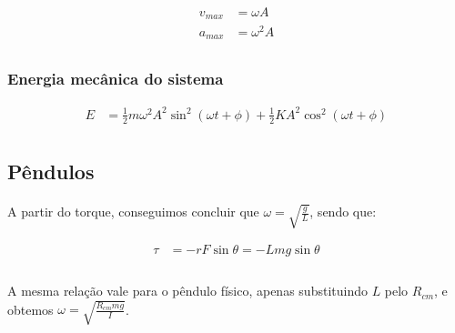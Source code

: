\documentclass{article}
\newcommand{\meio}{\frac{1}{2}}
\begin{document}
            \begin{align*}
                v_{max} &= \omega A\\
                a_{max} &= \omega^2 A\\
            \end{align*}

            \subsubsection{Energia mecânica do sistema}
                \begin{align*}
                    E &= \meio m\omega^2 A^2 \sin^2{(\omega t + \phi)} + \meio K A^2 \cos^2{(\omega t + \phi)}\\
                \end{align*}

        \subsection{Pêndulos}
            \paragraph{}
            A partir do torque, conseguimos concluir que $\omega = \sqrt{\frac{g}{L}}$, sendo que:

            \begin{align*}
                \tau &= -r F \sin{\theta} = -Lmg\sin{\theta}\\
            \end{align*}

            \paragraph{}
            A mesma relação vale para o pêndulo físico, apenas substituindo $L$ pelo $R_{cm}$, e obtemos
            $\omega = \sqrt{\frac{R_{cm}mg}{I}}$.
\end{document}
